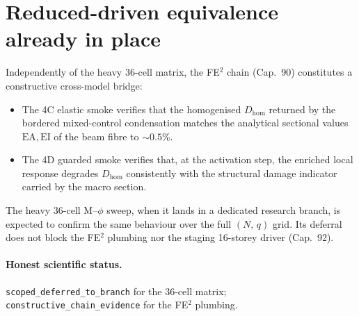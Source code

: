 \section{Reduced-driven equivalence already in place}

Independently of the heavy 36-cell matrix, the FE\(^2\) chain
(Cap.~90) constitutes a constructive cross-model bridge:

\begin{itemize}
  \item The 4C elastic smoke verifies that the homogenised
        \(D_{\mathrm{hom}}\) returned by the bordered mixed-control
        condensation matches the analytical sectional values
        \(\mathrm{EA}, \mathrm{EI}\) of the beam fibre to \(\sim 0.5\%\).
  \item The 4D guarded smoke verifies that, at the activation step,
        the enriched local response degrades \(D_{\mathrm{hom}}\)
        consistently with the structural damage indicator carried by
        the macro section.
\end{itemize}

The heavy 36-cell M--\(\phi\) sweep, when it lands in a dedicated
research branch, is expected to confirm the same behaviour over the
full \((N,\,q)\) grid. Its deferral does not block the FE\(^2\)
plumbing nor the staging 16-storey driver (Cap.~92).

\paragraph{Honest scientific status.}
\texttt{scoped\_deferred\_to\_branch} for the 36-cell matrix;
\texttt{constructive\_chain\_evidence} for the FE\(^2\) plumbing.
